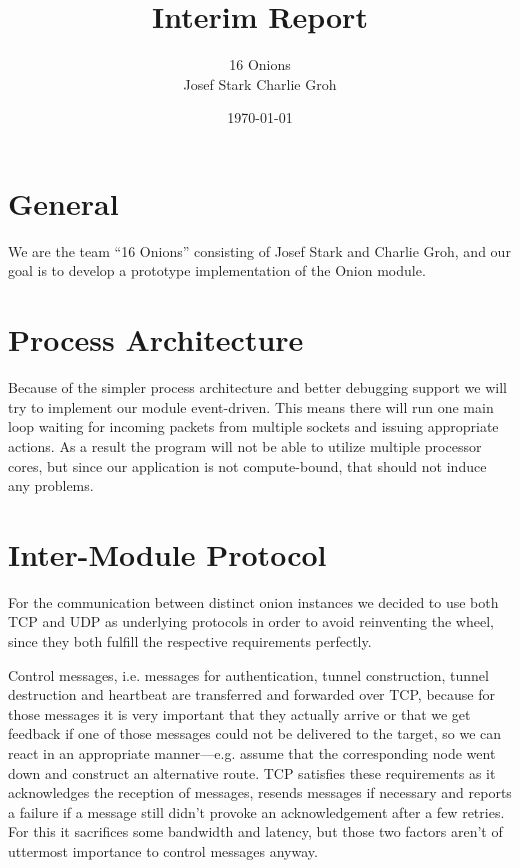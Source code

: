 \documentclass{article}
\begin{document}
\title{\Huge Interim Report \normalsize}
\date{\today}
\author{\LARGE 16 Onions \normalsize \\[5pt] Josef Stark \hspace{20pt} Charlie Groh}
\maketitle
{\let\thefootnote\relax{}}

\section{General}
We are the team ``16 Onions'' consisting of Josef Stark and Charlie Groh,
and our goal is to develop a prototype implementation of the Onion module.

\section{Process Architecture}
Because of the simpler process architecture and better debugging support we will try to implement
our module event-driven. This means there will run one main loop waiting for incoming packets from
multiple sockets and issuing appropriate actions. As a result the program will not be able to
utilize multiple processor cores, but since our application is not compute-bound, that
should not induce any problems.

\section{Inter-Module Protocol}
For the communication between distinct onion instances we decided to use both TCP and UDP as underlying protocols in order to avoid reinventing the wheel, since they both fulfill the respective requirements perfectly.

Control messages, i.e. messages for authentication, tunnel construction, tunnel destruction and heartbeat are transferred and forwarded over TCP, because for those messages it is very important that they actually arrive or that we get feedback if one of those messages could not be delivered to the target, so we can react in an appropriate manner---e.g. assume that the corresponding node went down and construct an alternative route. TCP satisfies these requirements as it acknowledges the reception of messages, resends messages if necessary and reports a failure if a message still didn't provoke an acknowledgement after a few retries. For this it sacrifices some bandwidth and latency, but those two factors aren't of uttermost importance to control messages anyway. 
\end{document}

